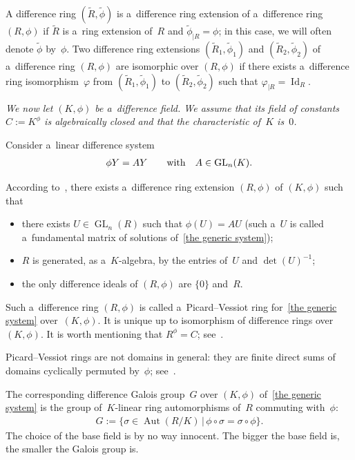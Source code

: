 \documentclass[11pt]{article}
\numberwithin{equation}{section}
\begin{document}
A dif\/ference ring $(\widetilde{R},\widetilde{\phi})$ is a~dif\/ference ring extension of a~dif\/ference ring $(R,\phi)$ if
$\widetilde{R}$ is a~ring extension of~$R$ and $\widetilde{\phi}_{\vert R}=\phi$; in this case, we will often denote
$\widetilde{\phi}$ by~$\phi$.
Two dif\/ference ring extensions $(\widetilde{R}_{1},\widetilde{\phi}_{1})$ and $(\widetilde{R}_{2},\widetilde{\phi}_{2})$
of a~dif\/ference ring $(R,\phi)$ are isomorphic over $(R,\phi)$ if there exists a~dif\/ference ring isomorphism~$\varphi$
from $(\widetilde{R}_{1},\widetilde{\phi}_{1})$ to $(\widetilde{R}_{2},\widetilde{\phi}_{2})$ such that $\varphi_{\vert
R}=\operatorname{Id}_{R}$.

{\it We now let $(K,\phi)$ be a~difference field.
We assume that its field of constants $C:=K^{\phi}$ is algebraically closed and that the characteristic of~$K$ is~$0$.}

Consider a~linear dif\/ference system
\begin{gather}
\label{the generic system}
\phi Y=AY \qquad \hbox{with} \quad A \in \operatorname{GL}_{n}(K).
\end{gather}

According to~\cite[Section~1.1]{VdPS97}, there exists a~dif\/ference ring extension $(R,\phi)$ of $(K,\phi)$ such that
\begin{itemize}\itemsep=0pt
\item[1)] there exists $U \in \operatorname{GL}_{n}(R)$ such that $\phi (U) = AU$ (such a~$U$ is called a~fundamental
matrix of solutions of~\eqref{the generic system});
\item[2)] $R$ is generated, as a~$K$-algebra, by the entries of~$U$ and $\det(U)^{-1}$;
\item[3)] the only dif\/ference ideals of $(R,\phi)$ are $\{0\}$ and~$R$.
\end{itemize}
Such a~dif\/ference ring $(R,\phi)$ is called a~Picard--Vessiot ring for~\eqref{the generic system} over~$(K,\phi)$.
It is unique up to isomorphism of dif\/ference rings over $(K,\phi)$.
It is worth mentioning that $R^{\phi}=C$; see~\cite[Lemma~1.8]{VdPS97}.
\begin{Remark}
Picard--Vessiot rings are not domains in general: they are f\/inite direct sums of domains cyclically permuted by~$\phi$;
see~\cite[Corollary~1.16]{VdPS97}.
\end{Remark}

The corresponding dif\/ference Galois group~$G$ over $(K,\phi)$ of~\eqref{the generic system} is the group of~$K$-linear
ring automorphisms of~$R$ commuting with~$\phi$:
\begin{gather*}
G:=\{\sigma \in \operatorname{Aut}(R/K) \, | \, \phi\circ\sigma=\sigma\circ \phi \}.
\end{gather*}
The choice of the base f\/ield is by no way innocent.
The bigger the base f\/ield is, the smaller the Galois group is.
\end{document}
